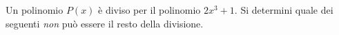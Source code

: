 Un polinomio $P(x)$ è diviso per il polinomio
$2x^3 + 1$.  Si determini quale dei seguenti \emph{non}
può essere il resto della
divisione.
